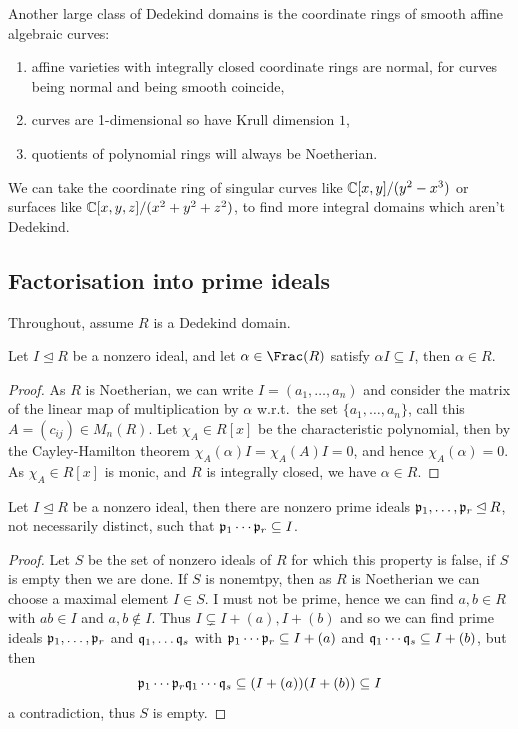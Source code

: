 \documentclass{article}
\begin{document}
Another large class of Dedekind domains is the coordinate rings of smooth affine algebraic curves: \begin{enumerate}
    \item affine varieties with integrally closed coordinate rings are normal, for curves being normal and being smooth coincide,
    \item curves are 1-dimensional so have Krull dimension $1$,
    \item quotients of polynomial rings will always be Noetherian.
\end{enumerate}

We can take the coordinate ring of singular curves like $\mathbb{C}[x,y]/(y^2-x^3)$ or surfaces like $\mathbb{C}[x,y,z]/(x^2+y^2+z^2)$, to find more integral domains which aren't Dedekind.

\subsection{Factorisation into prime ideals}

Throughout, assume $R$ is a Dedekind domain.

\begin{lemma}
    Let $I\unlhd R$ be a nonzero ideal, and let $\alpha\in\Frac(R)$ satisfy $\alpha I\subseteq I$, then $\alpha\in R$.
    \begin{proof}
        As $R$ is Noetherian, we can write $I=(a_1,\ldots,a_n)$ and consider the matrix of the linear map of multiplication by $\alpha$ w.r.t.~the set $\{a_1,\ldots,a_n\}$, call this $A=(c_{ij})\in M_n(R)$. Let $\chi_A\in R[x]$ be the characteristic polynomial, then by the Cayley-Hamilton theorem $\chi_A(\alpha)I = \chi_A(A)I = 0$, and hence $\chi_A(\alpha)=0$. As $\chi_A\in R[x]$ is monic, and $R$ is integrally closed, we have $\alpha\in R$.
    \end{proof}
\end{lemma}

\begin{lemma}
    Let $I\unlhd R$ be a nonzero ideal, then there are nonzero prime ideals $\mathfrak{p}_1,\ldots,\mathfrak{p}_r\unlhd R$, not necessarily distinct, such that $\mathfrak{p}_1\cdots\mathfrak{p}_r\subseteq I$.
    \begin{proof}
        Let $S$ be the set of nonzero ideals of $R$ for which this property is false, if $S$ is empty then we are done. If $S$ is nonemtpy, then as $R$ is Noetherian we can choose a maximal element $I\in S$. I must not be prime, hence we can find $a,b\in R$ with $ab\in I$ and $a,b\not\in I$. Thus $I\subsetneq I+(a), I+(b)$ and so we can find prime ideals $\mathfrak{p}_1,\ldots,\mathfrak{p}_r$ and $\mathfrak{q}_1,\ldots\mathfrak{q}_s$ with $\mathfrak{p}_1\cdots\mathfrak{p}_r\subseteq I+(a)$ and $\mathfrak{q}_1\cdots\mathfrak{q}_s\subseteq I+(b)$, but then \[
        \mathfrak{p}_1\cdots\mathfrak{p}_r\mathfrak{q}_1\cdots\mathfrak{q}_s \subseteq (I+(a))(I+(b))\subseteq I
        \] a contradiction, thus $S$ is empty.
    \end{proof}
\end{lemma}
\end{document}
